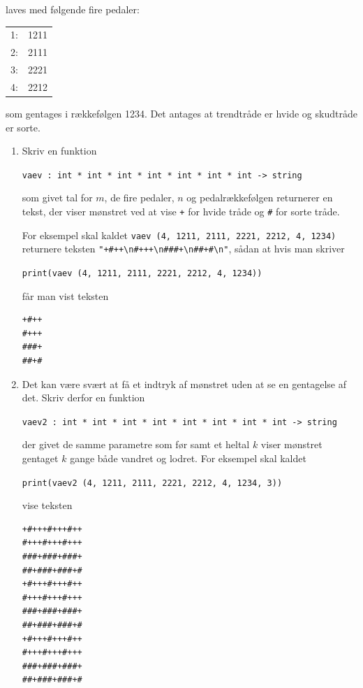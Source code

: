 \documentclass[a4paper,12pt]{article}
\begin{document}
laves med følgende fire pedaler:

\begin{tabular}{rr}
1: & 1211\\
2: & 2111\\
3: & 2221\\
4: & 2212
\end{tabular}

som gentages i rækkefølgen 1234.  Det antages at trendtråde er hvide
og skudtråde er sorte.

\begin{enumerate}[{1}N1]

\item Skriv en funktion

\texttt{vaev : int * int * int * int * int * int * int -> string}

som givet tal for $m$, de fire pedaler, $n$ og pedalrækkefølgen
returnerer en tekst, der viser mønstret ved at vise \texttt{+} for
hvide tråde og \texttt{\#} for sorte tråde.

For eksempel skal kaldet \texttt{vaev (4, 1211, 2111, 2221, 2212, 4,
  1234)} returnere teksten \verb|"+#++\n#+++\n###+\n##+#\n"|, sådan at
hvis man skriver

\texttt{print(vaev (4, 1211, 2111, 2221, 2212, 4, 1234))}

får man vist teksten

\begin{Verbatim}[baselinestretch=0.8]
+#++
#+++
###+
##+#
\end{Verbatim}

\item Det kan være svært at få et indtryk af mønstret uden at se en
  gentagelse af det.  Skriv derfor en funktion

\texttt{vaev2 : int * int * int * int * int * int * int  * int -> string}

der givet de samme parametre som før samt et heltal $k$ viser mønstret
gentaget $k$ gange både vandret og lodret.  For eksempel skal kaldet


\texttt{print(vaev2 (4, 1211, 2111, 2221, 2212, 4, 1234, 3))}

vise teksten

\begin{Verbatim}[baselinestretch=0.8]
+#+++#+++#++
#+++#+++#+++
###+###+###+
##+###+###+#
+#+++#+++#++
#+++#+++#+++
###+###+###+
##+###+###+#
+#+++#+++#++
#+++#+++#+++
###+###+###+
##+###+###+#
\end{Verbatim}

\end{enumerate}
\end{document}
